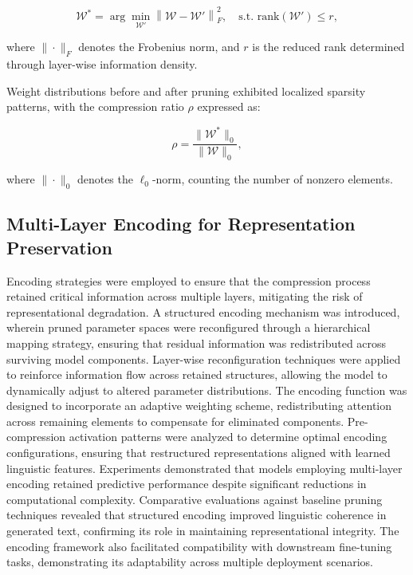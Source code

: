 \documentclass{article}
\begin{document}
\begin{equation}
	\mathcal{W}^{*} = \arg \min_{\mathcal{W}'} \left\| \mathcal{W} - \mathcal{W}' \right\|_F^2, \quad \text{s.t. } \text{rank}(\mathcal{W}') \leq r,
\end{equation}

where \( \|\cdot\|_F \) denotes the Frobenius norm, and \( r \) is the reduced rank determined through layer-wise information density.

Weight distributions before and after pruning exhibited localized sparsity patterns, with the compression ratio \( \rho \) expressed as:

\begin{equation}
	\rho = \frac{\|\mathcal{W}^*\|_0}{\|\mathcal{W}\|_0},
\end{equation}

where \( \|\cdot\|_0 \) denotes the \( \ell_0 \)-norm, counting the number of nonzero elements. 









\subsection{Multi-Layer Encoding for Representation Preservation}

Encoding strategies were employed to ensure that the compression process retained critical information across multiple layers, mitigating the risk of representational degradation. A structured encoding mechanism was introduced, wherein pruned parameter spaces were reconfigured through a hierarchical mapping strategy, ensuring that residual information was redistributed across surviving model components. Layer-wise reconfiguration techniques were applied to reinforce information flow across retained structures, allowing the model to dynamically adjust to altered parameter distributions. The encoding function was designed to incorporate an adaptive weighting scheme, redistributing attention across remaining elements to compensate for eliminated components. Pre-compression activation patterns were analyzed to determine optimal encoding configurations, ensuring that restructured representations aligned with learned linguistic features. Experiments demonstrated that models employing multi-layer encoding retained predictive performance despite significant reductions in computational complexity. Comparative evaluations against baseline pruning techniques revealed that structured encoding improved linguistic coherence in generated text, confirming its role in maintaining representational integrity. The encoding framework also facilitated compatibility with downstream fine-tuning tasks, demonstrating its adaptability across multiple deployment scenarios.
\end{document}
